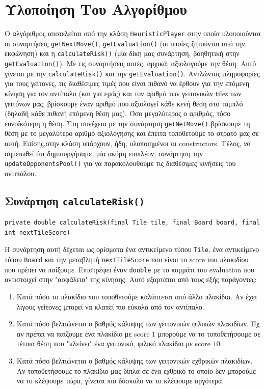 \chapter{Υλοποίηση Του Αλγορίθμου}
\begin{sloppypar}
Ο αλγόριθμος αποτελείται από την κλάση \lstinline!HeuristicPlayer! στην οποία υλοποιούνται οι  
συναρτήσεις  \lstinline!getNextMove()!,
\lstinline!getEvaluation()! (οι οποίες ζητούνται από την εκφώνηση) και η 
\lstinline!calculateRisk()! (μία δίκη μας συνάρτηση, βοηθητική στην \lstinline!getEvaluation()!).
Με τις συναρτήσεις αυτές, αρχικά, αξιολογούμε την θέση.
Αυτό γίνεται με την \lstinline!calculateRisk()! και την 
\lstinline!getEvaluation()!.
Αντλώντας πληροφορίες για τους γείτονες, τις διαθέσιμες τιμές που είναι 
πιθανό να έρθουν για την επόμενη κίνηση  για τον αντίπαλο (και για εμάς) και τον αριθμό 
των γειτονικών tiles των γειτόνων μας,
βρίσκουμε έναν αριθμό που αξιολογεί κάθε κενή θέση στο ταμπλό
(δηλαδή κάθε πιθανή επόμενη θέση μας).
Όσο μεγαλύτερος ο αριθμός, τόσο ευνοϊκότερη η θέση.
Στη συνέχεια με την συνάρτηση \lstinline!getNetMove()! βρίσκουμε τη 
θέση με το μεγαλύτερο αριθμό αξιολόγησης και έπειτα τοποθετούμε το στρατό μας σε αυτή.
Επίσης,στην κλάση υπάρχουν, ήδη, υλοποιημένοι οι constructors.
Τέλος, να σημειωθεί ότι δημιουργήσαμε, μία ακόμη επιπλέον, συνάρτηση την \lstinline!updateOpponentsPool()! για να 
παρακολουθούμε τις διαθέσιμες κινήσεις του αντιπάλου.
\end{sloppypar}

\section{Συνάρτηση \texttt{calculateRisk()}}
\begin{lstlisting}[numbers=none, breaklines=true, title={Declaration της συνάρτησης}]
private double calculateRisk(final Tile tile, final Board board, final int nextTileScore)
\end{lstlisting}
Η συνάρτηση αυτή δέχεται ως ορίσματα ένα αντικείμενο τύπου \lstinline!Tile!,
ένα αντικείμενο τύπου \lstinline!Board! και
την μεταβλητή \lstinline!nextTileScore! που είναι το score του πλακιδίου που πρέπει να παίξουμε.
Επιστρέφει έναν \lstinline!double! με το κομμάτι του evaluation που αντιστοιχεί στην "ασφάλεια" της κίνησης.
Αυτό εξαρτάται από τους εξής παράγοντες:
\begin{enumerate}
\item Κατά πόσο το πλακίδιο που τοποθετούμε καλύπτεται από άλλα πλακίδια.
Αν έχει λίγους γείτονες μπορεί να κλαπεί πιο εύκολα από τον αντίπαλο.
\item Κατά πόσο βελτιώνεται ο βαθμός κάλυψης των γειτονικών φιλικών πλακιδίων.
Πχ αν πρέπει να παίξουμε ένα πλακίδιο με score $1$ μπορούμε να το τοποθετήσουμε σε τέτοια θέση που "κλείνει" ένα γειτονικό, φιλικό πλακίδιο με score $10$.
\item Κατά πόσο βελτιώνεται ο βαθμός κάλυψης των γειτονικών εχθρικών πλακιδίων.
Αν τοποθετήσουμε το πλακίδιο μας δίπλα σε ένα εχθρικό το οποίο δεν μπορούμε να το κλέψουμε τώρα, γίνεται πιο δύσκολο να το κλέψουμε αργότερα.
\end{enumerate}

